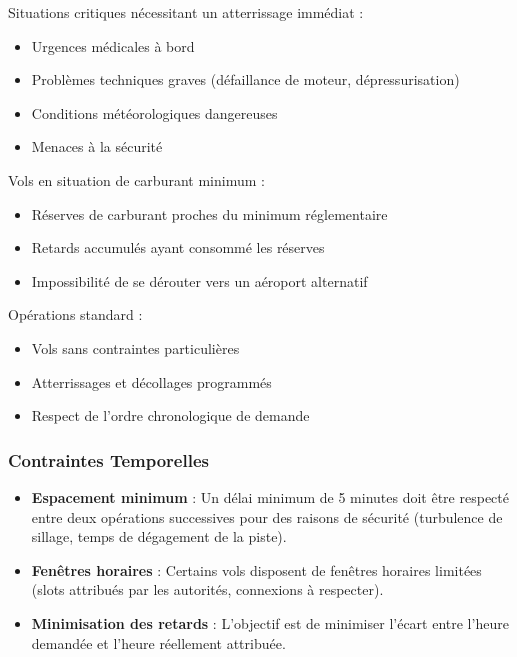 \documentclass[12pt,a4paper]{article}
\begin{document}
\begin{description}[style=nextline, leftmargin=0pt]
    \item[\color{primaryblue}Priorité 1 - Urgence]
    Situations critiques nécessitant un atterrissage immédiat :
    \begin{itemize}
        \item Urgences médicales à bord
        \item Problèmes techniques graves (défaillance de moteur, dépressurisation)
        \item Conditions météorologiques dangereuses
        \item Menaces à la sécurité
    \end{itemize}

    \item[\color{primaryblue}Priorité 2 - Carburant Faible]
    Vols en situation de carburant minimum :
    \begin{itemize}
        \item Réserves de carburant proches du minimum réglementaire
        \item Retards accumulés ayant consommé les réserves
        \item Impossibilité de se dérouter vers un aéroport alternatif
    \end{itemize}

    \item[\color{primaryblue}Priorité 3 - Vols Normaux]
    Opérations standard :
    \begin{itemize}
        \item Vols sans contraintes particulières
        \item Atterrissages et décollages programmés
        \item Respect de l'ordre chronologique de demande
    \end{itemize}
\end{description}

\subsubsection{Contraintes Temporelles}

\begin{itemize}[leftmargin=*]
    \item[\color{primaryblue}$\blacktriangleright$] \textbf{Espacement minimum} : Un délai minimum de 5 minutes doit être respecté entre deux opérations successives pour des raisons de sécurité (turbulence de sillage, temps de dégagement de la piste).

    \item[\color{primaryblue}$\blacktriangleright$] \textbf{Fenêtres horaires} : Certains vols disposent de fenêtres horaires limitées (slots attribués par les autorités, connexions à respecter).

    \item[\color{primaryblue}$\blacktriangleright$] \textbf{Minimisation des retards} : L'objectif est de minimiser l'écart entre l'heure demandée et l'heure réellement attribuée.
\end{itemize}
\end{document}

